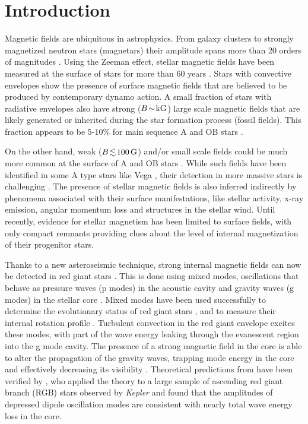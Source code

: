 
\section{Introduction}\label{intro}
Magnetic fields are ubiquitous in astrophysics. From  galaxy clusters to strongly magnetized neutron stars (magnetars) their amplitude spans more than 20 orders of magnitudes \citep{Brandenburg_2005}. Using the Zeeman effect, stellar magnetic fields have been measured at the surface of stars
for more than 60 years \citep{Babcock_1947,Landstreet_1992,Donati_2009}. Stars with convective envelopes show the presence of surface magnetic fields that are believed to be produced by contemporary dynamo action. A small fraction of stars with radiative envelopes also have strong ($B \! \sim \! {\rm kG}$) large scale magnetic fields that are likely generated or inherited during the star formation process (fossil fields). This fraction appears to be 5-10\% for main sequence A and OB stars \citep[e.g.,][]{Auriere2004,2012ASPC..464..405W}.

On the other hand, weak ($B \! \lesssim \! 100 \, {\rm G}$) and/or small scale fields could be much more common at the surface of A and OB stars \citep{Cantiello_2009,Cantiello_2011,Braithwaite_2012}. While such fields have been identified in some A type stars like Vega \citep{Lignieres2009}, their detection in more massive stars is challenging \citep{2013A&A...554A..93K}. The presence of stellar magnetic fields is also inferred indirectly by phenomena associated with their surface manifestations, like stellar activity, x-ray emission, angular momentum loss and structures in the stellar wind. Until recently, evidence for stellar magnetism has been limited to surface fields, with only compact remnants providing clues about the level of internal magnetization of their progenitor stars.

Thanks to a new asteroseismic technique, strong internal magnetic fields can now be detected in red giant stars \citep{Fuller_2015}. This is done using mixed modes, oscillations that behave as pressure waves (p modes) in the acoustic cavity and gravity waves (g modes) in the stellar core \citep{1974A&A....36..107S,1975PASJ...27..237O,1977A&A....58...41A,2001MNRAS.328..601D,2004SoPh..220..137C,Dupret_2009}. Mixed modes have been used successfully to determine the evolutionary status of red giant stars \citep{Bedding_2011}, and to measure their internal rotation profile \citep{Beck_2011}. Turbulent convection in the red giant envelope excites these modes, with part of the wave energy leaking through the evanescent region into the g mode cavity. The presence of a strong magnetic field in the core is able to alter the propagation of the gravity waves, trapping  mode energy in the core and effectively decreasing its visibility \citep[magnetic greenhouse effect,][]{Fuller_2015}. Theoretical predictions from \citet{Fuller_2015} have been verified by \citet{Stello_2016}, who applied the theory to a large sample of ascending red giant branch (RGB) stars observed by {\it Kepler} and found that the amplitudes of depressed dipole oscillation modes are consistent with nearly total wave energy loss in the core.


